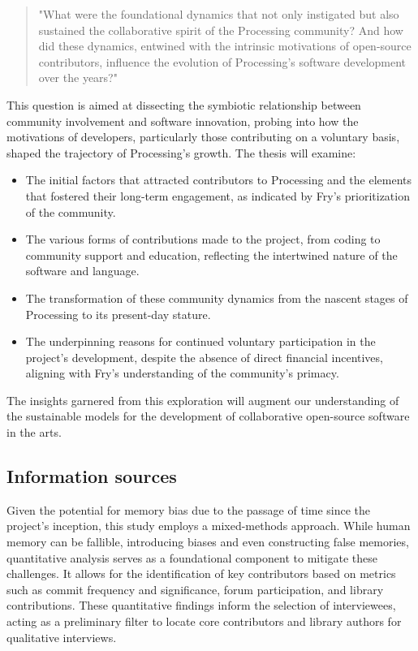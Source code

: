 \begin{quote}
"What were the foundational dynamics that not only instigated but also sustained the collaborative spirit of the Processing community? And how did these dynamics, entwined with the intrinsic motivations of open-source contributors, influence the evolution of Processing's software development over the years?"
\end{quote}

This question is aimed at dissecting the symbiotic relationship between community involvement and software innovation, probing into how the motivations of developers, particularly those contributing on a voluntary basis, shaped the trajectory of Processing's growth. The thesis will examine:

\begin{itemize}
\item The initial factors that attracted contributors to Processing and the elements that fostered their long-term engagement, as indicated by Fry's prioritization of the community.
\item The various forms of contributions made to the project, from coding to community support and education, reflecting the intertwined nature of the software and language.
\item The transformation of these community dynamics from the nascent stages of Processing to its present-day stature.
\item The underpinning reasons for continued voluntary participation in the project's development, despite the absence of direct financial incentives, aligning with Fry's understanding of the community's primacy.
\end{itemize}

The insights garnered from this exploration will augment our understanding of the sustainable models for the development of collaborative open-source software in the arts.

\subsection{Information sources}

Given the potential for memory bias due to the passage of time since the project's inception, this study employs a mixed-methods approach. While human memory can be fallible, introducing biases and even constructing false memories, quantitative analysis serves as a foundational component to mitigate these challenges. It allows for the identification of key contributors based on metrics such as commit frequency and significance, forum participation, and library contributions. These quantitative findings inform the selection of interviewees, acting as a preliminary filter to locate core contributors and library authors for qualitative interviews.

